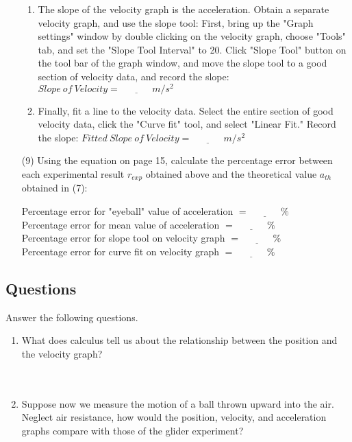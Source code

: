 \documentclass{article}
\begin{document}
\begin{enumerate}
\begin{enumerate}
\item The slope of the velocity graph is the acceleration. Obtain a separate velocity graph, and use the slope tool: First, bring up the "Graph settings" window by double clicking on the velocity graph, choose "Tools" tab, and set the "Slope Tool Interval" to 20. Click "Slope Tool" button on the tool bar of the graph window, and move the slope tool to a good section of velocity data, and record the slope:
$Slope~of~Velocity=\underline{~~~~~~~~~~~~~~~}m/s^2$

\item Finally, fit a line to the velocity data. Select the entire section of good velocity data, click the "Curve fit" tool, and select "Linear Fit." Record the slope: 
$Fitted~Slope~of~Velocity=\underline{~~~~~~~~~~~~~~~}m/s^2$
\end{enumerate}

\item[(9)] Using the equation on page 15, calculate the percentage error between each experimental result $r_{exp}$ obtained above and the theoretical value $a_{th}$ obtained in (7):

Percentage error for "eyeball" value of acceleration $=\underline{~~~~~~~~~~~~~~~}\% $ \\ 
Percentage error for mean value of acceleration $=\underline{~~~~~~~~~~~~~~~}\%$ \\ 
Percentage error for slope tool on velocity graph $=\underline{~~~~~~~~~~~~~~~}\% $ \\ 
Percentage error for curve fit on velocity graph $=\underline{~~~~~~~~~~~~~~~}\% $


\end{enumerate}


\subsection*{Questions}
Answer the following questions.

\begin{enumerate}
\item What does calculus tell us about the relationship between the position and the velocity graph? \\ \\ \\

\item Suppose now we measure the motion of a ball thrown upward into the air. Neglect air resistance, how would the position, velocity, and acceleration graphs compare with those of the glider experiment? \\ \\ \\ \\ \\

\end{enumerate}
\end{document}
